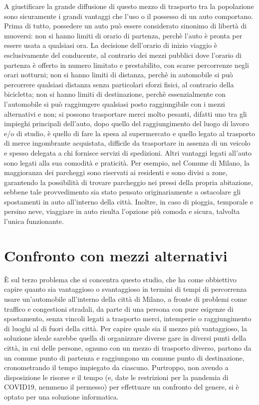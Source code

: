 A giustificare la grande diffusione di questo mezzo di trasporto tra la popolazione sono sicuramente i grandi vantaggi che l'uso o il possesso di un auto comportano. Prima di tutto, possedere un auto può essere considerato sinonimo di libertà di muoversi: non si hanno limiti di orario di partenza, perchè l'auto è pronta per essere usata a qualsiasi ora. La decisione dell'orario di inizio viaggio è esclusivamente del conducente, al contrario dei mezzi pubblici dove l'orario di partenza è offerto in numero limitato e prestabilito, con scarse percorrenze negli orari notturni; non si hanno limiti di distanza, perchè in automobile si può percorrere qualsiasi distanza senza particolari sforzi fisici, al contrario della bicicletta; non si hanno limiti di destinazione, perchè essenzialmente con l'automobile si può raggiungere qualsiasi posto raggiungibile con i mezzi alternativi e non; si possono trasportare merci molto pesanti, difatti uno tra gli impieghi principali dell'auto, dopo quello del raggiungimento del luogo di lavoro e/o di studio, è quello di fare la spesa al supermercato e quello legato al trasporto di merce ingombrante acquistata, difficile da trasportare in assenza di un veicolo e spesso delegata a chi fornisce servizi di spedizioni. Altri vantaggi legati all'auto sono legati alla sua comodità e praticità. Per esempio, nel Comune di Milano, la maggioranza dei parcheggi sono riservati ai residenti e sono divisi a zone, garantendo la possibilità di trovare parcheggio nei pressi della propria abitazione, sebbene tale provvedimento sia stato pensato originariamente a ostacolare gli spostamenti in auto all'interno della città. Inoltre, in caso di pioggia, temporale e persino neve, viaggiare in auto risulta l'opzione più comoda e sicura, talvolta l'unica funzionante.

\section{Confronto con mezzi alternativi}

È sul terzo problema che si concentra questo studio, che ha come obbiettivo capire quanto sia vantaggioso o svantaggioso in termini di tempi di percorrenza usare un'automobile all'interno della città di Milano, a fronte di problemi come traffico e congestioni stradali, da parte di una persona con pure esigenze di spostamento, senza vincoli legati a trasporto merci, intemperie o raggiungimento di luoghi al di fuori della città. Per capire quale sia il mezzo più vantaggioso, la soluzione ideale sarebbe quella di organizzare diverse gare in diversi punti della città, in cui delle persone, ognuno con un mezzo di trasporto diverso, partono da un comune punto di partenza e raggiungono un comune punto di destinazione, cronometrando il tempo impiegato da ciascuno. Purtroppo, non avendo a disposizione le risorse e il tempo (e, date le restrizioni per la pandemia di COVID19, nemmeno il permesso) per effettuare un confronto del genere, si è optato per una soluzione informatica.

